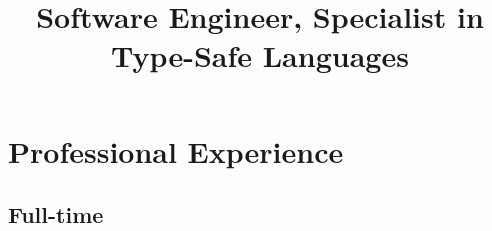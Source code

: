 \documentclass[11pt,a4paper,roman]{moderncv}
\title{Software Engineer, Specialist in Type-Safe Languages}
\begin{document}
\makecvtitle



\newcommand\seeabovedesc{(\textit{See description above.})}

\newcommand\altamont{Altamont, Tennessee, USA}
\newcommand\austin{Austin, Texas, USA}
\newcommand\centurion{Centurion, South Africa}
\newcommand\chattanooga{Chattanooga, Tennessee, USA}
\newcommand\chippewafalls{Chippewa Falls, Wisconsin, USA}
\newcommand\london{London, UK}
\newcommand\portland{Portland, Oregon, USA}
\newcommand\pretoria{Pretoria, South Africa}
\newcommand\sanfrancisco{San Francisco, California, USA}
\newcommand\stlouis{St. Louis, Missouri, USA}
\newcommand\utrecht{Utrecht, The Netherlands}
\newcommand\whitemarsh{White Marsh, Maryland, USA}

\newcommand\uu{Utrecht University}
\newcommand\wustl{Washington University in St. Louis}
\newcommand\wustlshort{Washington University}
\newcommand\ut{University of Texas at Austin}



\newcommand\Cpp{C{}\texttt{++}\xspace}


\section{Professional Experience}


\subsection{Full-time}
\end{document}
